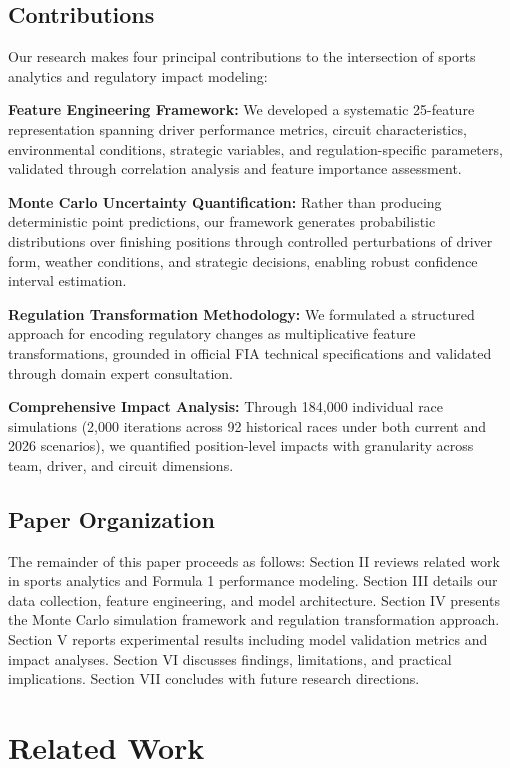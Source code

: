 \documentclass[conference]{IEEEtran}
\begin{document}
\subsection{Contributions}

Our research makes four principal contributions to the intersection of sports analytics and regulatory impact modeling:

\textbf{Feature Engineering Framework:} We developed a systematic 25-feature representation spanning driver performance metrics, circuit characteristics, environmental conditions, strategic variables, and regulation-specific parameters, validated through correlation analysis and feature importance assessment.

\textbf{Monte Carlo Uncertainty Quantification:} Rather than producing deterministic point predictions, our framework generates probabilistic distributions over finishing positions through controlled perturbations of driver form, weather conditions, and strategic decisions, enabling robust confidence interval estimation.

\textbf{Regulation Transformation Methodology:} We formulated a structured approach for encoding regulatory changes as multiplicative feature transformations, grounded in official FIA technical specifications and validated through domain expert consultation.

\textbf{Comprehensive Impact Analysis:} Through 184,000 individual race simulations (2,000 iterations across 92 historical races under both current and 2026 scenarios), we quantified position-level impacts with granularity across team, driver, and circuit dimensions.

\subsection{Paper Organization}

The remainder of this paper proceeds as follows: Section II reviews related work in sports analytics and Formula 1 performance modeling. Section III details our data collection, feature engineering, and model architecture. Section IV presents the Monte Carlo simulation framework and regulation transformation approach. Section V reports experimental results including model validation metrics and impact analyses. Section VI discusses findings, limitations, and practical implications. Section VII concludes with future research directions.

\section{Related Work}
\end{document}
